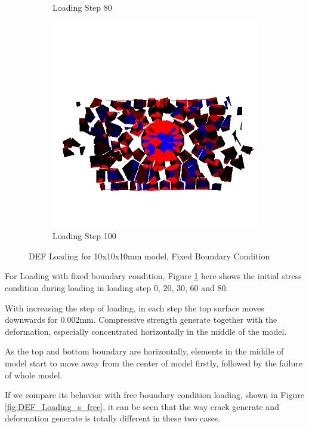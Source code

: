 \begin{figure}[ht!]
\begin{subfigure}{.33\textwidth}
      \caption{Loading Step 80}
      \end{subfigure}%
      \begin{subfigure}{.33\textwidth}
        \centering
        \includegraphics[width=1.0\linewidth]{Files/Small_DEF/IS2/DEP5-STEP(120).png}
        \caption{Loading Step 100}
      \end{subfigure}

  \caption{DEF Loading for 10x10x10mm model, Fixed Boundary Condition}
  \label{fig:DEF_Loading_s_fix}
\end{figure}

For Loading with fixed boundary condition, Figure \ref{fig:DEF_Loading_s_fix} here shows the initial stress condition during loading in loading step 0, 20, 30, 60 and 80.

With increasing the step of loading, in each step the top surface moves downwards for 0.002mm. Compressive strength generate together with the deformation, especially concentrated horizontally in the middle of the model.

As the top and bottom boundary are horizontally, elements in the middle of model start to move away from the center of model firstly, followed by the failure of whole model.

If we compare its behavior with free boundary condition loading, shown in Figure \ref{fig:DEF_Loading_s_free}, it can be seen that the way crack generate and deformation generate is totally different in these two cases.

